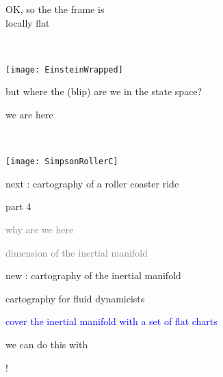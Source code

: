 \begin{frame}{}
    \begin{minipage}[b]{0.30\textwidth}
\begin{block}{
OK, so the the frame is
\\
locally flat
}
\end{block}
    \end{minipage}
~~~~~~
    \begin{minipage}[b]{0.60\textwidth}
\begin{center}
\texttt{[image: EinsteinWrapped]}
\end{center}
    \end{minipage}

\bigskip\bigskip

\begin{block}{
but where the (blip) are we in the state space?
}
\end{block}


\end{frame}

\begin{frame}{}
    \begin{minipage}[b]{0.30\textwidth}
\begin{block}{
we are
here
}
\end{block}
    \end{minipage}
~~~~~~
    \begin{minipage}[b]{0.50\textwidth}
\begin{center}
\texttt{[image: SimpsonRollerC]}
\end{center}
    \end{minipage}

\medskip
next : cartography of a roller coaster ride
\end{frame}


\begin{frame}{part 4}
\begin{enumerate}
              \item
    \textcolor{gray}{\small
why are we here
              \item
\statesp
              \item
dimension of the inertial manifold
    }
              \item
    {\Large
{\color{red} new :} cartography of the inertial manifold
                    }
            \end{enumerate}
\end{frame}


\begin{frame}{cartography for fluid dynamicists}
\bigskip

\textcolor{blue}{cover the inertial manifold with a set of flat charts}

\hfill
\vfill
we can do this with

\hfill {}!
\end{frame}

